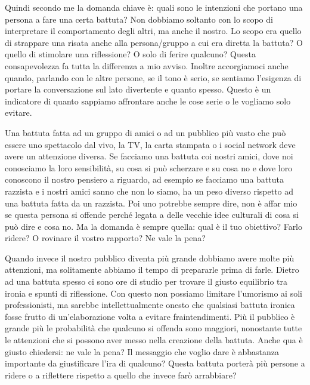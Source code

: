 \documentclass[12pt]{book} %
\begin{document}
\begin{mdframed}[linewidth=1pt]
\bigskip

Quindi secondo me la domanda chiave è: quali sono le intenzioni che portano una persona a fare una certa battuta? Non
dobbiamo soltanto con lo scopo di interpretare il comportamento degli altri, ma anche il nostro. Lo scopo era quello di
strappare una risata anche alla persona/gruppo a cui era diretta la battuta? O quello di stimolare una riflessione? O
solo di ferire qualcuno? Questa consapevolezza fa tutta la differenza a mio avviso. Inoltre accorgiamoci anche quando,
parlando con le altre persone, se il tono è serio, se sentiamo l'esigenza di portare la
conversazione sul lato divertente e quanto spesso. Questo è un indicatore di quanto sappiamo affrontare anche le cose
serie o le vogliamo solo evitare.


\bigskip

Una battuta fatta ad un gruppo di amici o ad un pubblico più vasto che può essere uno spettacolo dal vivo, la TV, la
carta stampata o i social network deve avere un attenzione diversa. Se facciamo una battuta coi nostri amici, dove noi
conosciamo la loro sensibilità, su cosa si può scherzare e su cosa no e dove loro conoscono il nostro pensiero a
riguardo, ad esempio se facciamo una battuta razzista e i nostri amici sanno che non lo siamo, ha un peso diverso
rispetto ad una battuta fatta da un razzista. Poi uno potrebbe sempre dire, non è affar mio se questa persona si
offende perché legata a delle vecchie idee culturali di cosa si può dire e cosa no. Ma la domanda è sempre quella: qual
è il tuo obiettivo? Farlo ridere? O rovinare il vostro rapporto? Ne vale la pena?


\bigskip

Quando invece il nostro pubblico diventa più grande dobbiamo avere molte più attenzioni, ma solitamente abbiamo il tempo
di prepararle prima di farle. Dietro ad una battuta spesso ci sono ore di studio per trovare il giusto equilibrio tra
ironia e spunti di riflessione. Con questo non possiamo limitare l'umorismo ai soli
professionisti, ma sarebbe intellettualmente onesto che qualsiasi battuta ironica fosse frutto di
un'elaborazione volta a evitare fraintendimenti. Più il pubblico è grande più le probabilità che
qualcuno si offenda sono maggiori, nonostante tutte le attenzioni che si possono aver messo nella creazione della
battuta. Anche qua è giusto chiedersi: ne vale la pena? Il messaggio che voglio dare è abbastanza importante da
giustificare l'ira di qualcuno? Questa battuta porterà più persone a ridere o a riflettere
rispetto a quello che invece farò arrabbiare?


\end{mdframed}
\end{document}
